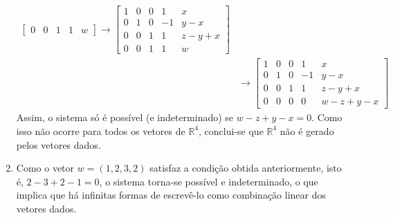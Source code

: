 \documentclass[12pt,a4paper]{article}
\newcommand*\R{\mathbb{R}}
\begin{document}
\begin{ExerciseList}
\begin{enumerate}
\begin{align*}
\begin{bmatrix}
0 & 0 & 1 & 1 & w
\end{bmatrix}
\rightarrow
\begin{bmatrix}
1 & 0 & 0 & 1 & x \\
0 & 1 & 0 & -1 & y-x \\
0 & 0 & 1 & 1 & z-y+x \\
0 & 0 & 1 & 1 & w
\end{bmatrix}\\
& \rightarrow
\begin{bmatrix}
1 & 0 & 0 & 1 & x \\
0 & 1 & 0 & -1 & y-x \\
0 & 0 & 1 & 1 & z-y+x \\
0 & 0 & 0 & 0 & w-z+y-x
\end{bmatrix}
\end{align*}
Assim, o sistema só é possível (e indeterminado) se $w-z+y-x = 0$. Como isso não ocorre para todos os vetores de $\R^4$, conclui-se que $\R^4$ não é gerado pelos vetores dados.

\item Como o vetor $w = (1,2,3,2)$ satisfaz a condição obtida anteriormente, isto é, $2-3+2-1 = 0$, o sistema torna-se possível e indeterminado, o que implica que há infinitas formas de escrevê-lo como combinação linear dos vetores dados.
\end{enumerate}


\end{ExerciseList}
\end{document}
